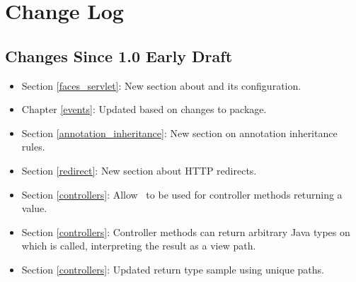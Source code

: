 \chapter{Change Log}

\section{Changes Since 1.0 Early Draft}

\begin{itemize}
\item Section \ref{faces_servlet}: New section about  and its configuration.
\item Chapter \ref{events}: Updated based on changes to  package.
\item Section \ref{annotation_inheritance}: New section on annotation inheritance rules.
\item Section \ref{redirect}: New section about HTTP redirects.
\item Section \ref{controllers}: Allow \View\ to be used for controller methods returning a 
 value. 
\item Section \ref{controllers}: Controller methods can return arbitrary Java types on which  is called, interpreting the result as a view path.
\item Section \ref{controllers}: Updated return type sample using unique paths.
\end{itemize}
